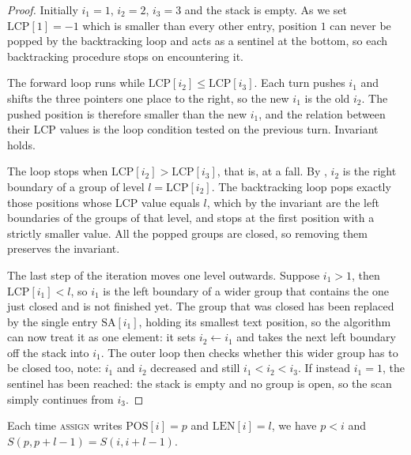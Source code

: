 \begin{proof}
    Initially \(i_1 = 1\), \(i_2 = 2\), \(i_3 = 3\) and the stack is empty. As we set \(\mathrm{LCP}[1] = -1\) which is smaller than every other entry, position \(1\) can never be popped by the backtracking loop and acts as a sentinel at the bottom, so each backtracking procedure stops on encountering it.

    The forward loop runs while \(\mathrm{LCP}[i_2] \leq \mathrm{LCP}[i_3]\). Each turn pushes \(i_1\) and shifts the three pointers one place to the right, so the new \(i_1\) is the old \(i_2\). The pushed position is therefore smaller than the new \(i_1\), and the relation between their LCP values is the loop condition tested on the previous turn. Invariant holds.

    The loop stops when \(\mathrm{LCP}[i_2] > \mathrm{LCP}[i_3]\), that is, at a fall. By , \(i_2\) is the right boundary of a group of level \(l = \mathrm{LCP}[i_2]\). The backtracking loop pops exactly those positions whose LCP value equals \(l\), which by the invariant are the left boundaries of the groups of that level, and stops at the first position with a strictly smaller value. All the popped groups are closed, so removing them preserves the invariant.

    The last step of the iteration moves one level outwards. Suppose \(i_1 > 1\), then \(\mathrm{LCP}[i_1] < l\), so \(i_1\) is the left boundary of a wider group that contains the one just closed and is not finished yet. The group that was closed has been replaced by the single entry \(\mathrm{SA}[i_1]\), holding its smallest text position, so the algorithm can now treat it as one element: it sets \(i_2 \gets i_1\) and takes the next left boundary off the stack into \(i_1\). The outer loop then checks whether this wider group has to be closed too, note: \(i_1\) and \(i_2\) decreased and still \(i_1 < i_2 < i_3\). If instead \(i_1 = 1\), the sentinel has been reached: the stack is empty and no group is open, so the scan simply continues from \(i_3\).
\end{proof} 

\begin{lemma}
\label{lem:cps-assign}
    Each time \textsc{assign} writes \(\mathrm{POS}[i] = p\) and \(\mathrm{LEN}[i] = l\), we have \(p < i\) and \(S(p, p + l - 1) = S(i, i + l - 1)\).
\end{lemma}

